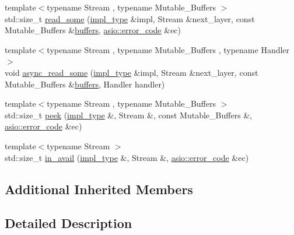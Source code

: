 \begin{DoxyCompactItemize}
\item 
{\footnotesize template$<$typename Stream , typename Mutable\+\_\+\+Buffers $>$ }\\std\+::size\+\_\+t \hyperlink{classasio_1_1ssl_1_1old_1_1detail_1_1openssl__stream__service_acd906c98791dd7253651137d3d1bea27}{read\+\_\+some} (\hyperlink{classasio_1_1ssl_1_1old_1_1detail_1_1openssl__stream__service_a2419fd5a889197ed63b6d0bd14656027}{impl\+\_\+type} \&impl, Stream \&next\+\_\+layer, const Mutable\+\_\+\+Buffers \&\hyperlink{group__async__read_ga54dede45c3175148a77fe6635222c47d}{buffers}, \hyperlink{classasio_1_1error__code}{asio\+::error\+\_\+code} \&ec)
\item 
{\footnotesize template$<$typename Stream , typename Mutable\+\_\+\+Buffers , typename Handler $>$ }\\void \hyperlink{classasio_1_1ssl_1_1old_1_1detail_1_1openssl__stream__service_a2d1af03633cdf58ba8dc3187220cb2c0}{async\+\_\+read\+\_\+some} (\hyperlink{classasio_1_1ssl_1_1old_1_1detail_1_1openssl__stream__service_a2419fd5a889197ed63b6d0bd14656027}{impl\+\_\+type} \&impl, Stream \&next\+\_\+layer, const Mutable\+\_\+\+Buffers \&\hyperlink{group__async__read_ga54dede45c3175148a77fe6635222c47d}{buffers}, Handler handler)
\item 
{\footnotesize template$<$typename Stream , typename Mutable\+\_\+\+Buffers $>$ }\\std\+::size\+\_\+t \hyperlink{classasio_1_1ssl_1_1old_1_1detail_1_1openssl__stream__service_aa49e1dce0b04f6a91428837fb39cd025}{peek} (\hyperlink{classasio_1_1ssl_1_1old_1_1detail_1_1openssl__stream__service_a2419fd5a889197ed63b6d0bd14656027}{impl\+\_\+type} \&, Stream \&, const Mutable\+\_\+\+Buffers \&, \hyperlink{classasio_1_1error__code}{asio\+::error\+\_\+code} \&ec)
\item 
{\footnotesize template$<$typename Stream $>$ }\\std\+::size\+\_\+t \hyperlink{classasio_1_1ssl_1_1old_1_1detail_1_1openssl__stream__service_abeaa89c77701e66bfc2b528c089f963c}{in\+\_\+avail} (\hyperlink{classasio_1_1ssl_1_1old_1_1detail_1_1openssl__stream__service_a2419fd5a889197ed63b6d0bd14656027}{impl\+\_\+type} \&, Stream \&, \hyperlink{classasio_1_1error__code}{asio\+::error\+\_\+code} \&ec)
\end{DoxyCompactItemize}
\subsection*{Additional Inherited Members}


\subsection{Detailed Description}


